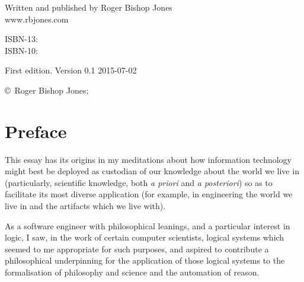 \begin{titlepage}
\maketitle

\hspace{2in}

\vfill

\begin{centering}

{\small

Written and published by Roger Bishop Jones\\
www.rbjones.com\\

\vspace{0.2in}

ISBN-13: \\
ISBN-10: 

\vspace{0.2in}

}%
{\scriptsize

First edition. \hfil Version 0.1 \hfil 2015-07-02

\vspace{0.2in}

\copyright\ Roger Bishop Jones;

}%

\end{centering}

\thispagestyle{empty}

\end{titlepage}

{\parskip=0pt\tableofcontents}


\chapter*{Preface}\label{Preface}

This essay has its origins in my meditations about how information technology might best be deployed as custodian of our knowledge about the world we live in (particularly, scientific knowledge, both {\it a priori} and {\it a posteriori}) so as to facilitate its most diverse application (for example, in engineering the world we live in and the artifacts which we live with).

As a software engineer with philosophical leanings, and a particular interest in logic, I saw, in the work of certain computer scientists, logical systems which seemed to me appropriate for such purposes, and aspired to contribute a philosophical underpinning for the application of those logical systems to the formalisation of philosophy and science and the automation of reason.

